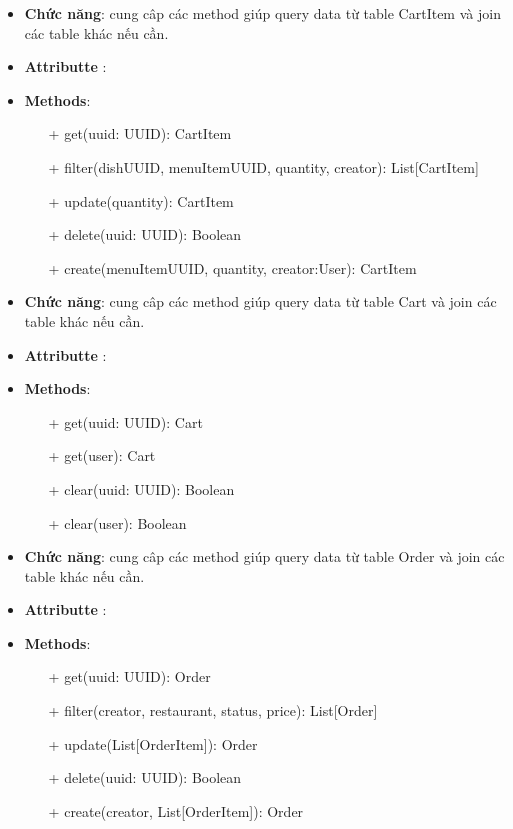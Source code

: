 \begin{itemize}
    \item \textbf{Chức năng}:  cung câp các method giúp query data từ table CartItem và join các table khác nếu cần.
    \item \textbf{Attributte} :
    \item \textbf{Methods}:
    \begin{itemize}
        \item[+] get(uuid: UUID): CartItem
        \item[+] filter(dishUUID, menuItemUUID, quantity, creator): List[CartItem]
        \item[+] update(quantity): CartItem
        \item[+] delete(uuid: UUID): Boolean
        \item[+] create(menuItemUUID, quantity, creator:User): CartItem
    \end{itemize}
\end{itemize}
\begin{itemize}
    \item \textbf{Chức năng}:  cung câp các method giúp query data từ table Cart và join các table khác nếu cần.
    \item \textbf{Attributte} :
    \item \textbf{Methods}:
    \begin{itemize}
        \item[+] get(uuid: UUID): Cart
        \item[+] get(user): Cart
        \item[+] clear(uuid: UUID): Boolean
        \item[+] clear(user): Boolean
    \end{itemize}
\end{itemize}
\begin{itemize}
    \item \textbf{Chức năng}:  cung câp các method giúp query data từ table Order và join các table khác nếu cần.
    \item \textbf{Attributte} :
    \item \textbf{Methods}:
    \begin{itemize}
        \item[+] get(uuid: UUID): Order
        \item[+] filter(creator, restaurant, status, price): List[Order]
        \item[+] update(List[OrderItem]): Order
        \item[+] delete(uuid: UUID): Boolean
        \item[+] create(creator, List[OrderItem]): Order
    \end{itemize}
\end{itemize}

